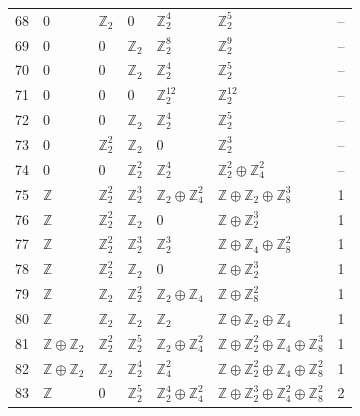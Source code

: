 \documentclass[10pt]{article}
\begin{document}
\begin{longtable}{rlllllr}
68 & $0$ & $\mathbb{Z}_{2}$ & $0$ & $\mathbb{Z}_{2}^{4}$ & $\mathbb{Z}_{2}^{5}$ & -- \\
69 & $0$ & $0$ & $\mathbb{Z}_{2}$ & $\mathbb{Z}_{2}^{8}$ & $\mathbb{Z}_{2}^{9}$ & -- \\
70 & $0$ & $0$ & $\mathbb{Z}_{2}$ & $\mathbb{Z}_{2}^{4}$ & $\mathbb{Z}_{2}^{5}$ & -- \\
71 & $0$ & $0$ & $0$ & $\mathbb{Z}_{2}^{12}$ & $\mathbb{Z}_{2}^{12}$ & -- \\
72 & $0$ & $0$ & $\mathbb{Z}_{2}$ & $\mathbb{Z}_{2}^{4}$ & $\mathbb{Z}_{2}^{5}$ & -- \\
73 & $0$ & $\mathbb{Z}_{2}^{2}$ & $\mathbb{Z}_{2}$ & $0$ & $\mathbb{Z}_{2}^{3}$ & -- \\
74 & $0$ & $0$ & $\mathbb{Z}_{2}^{2}$ & $\mathbb{Z}_{2}^{4}$ & $\mathbb{Z}_{2}^{2}\oplus \mathbb{Z}_{4}^{2}$ & -- \\
75 & $\mathbb{Z}$ & $\mathbb{Z}_{2}^{2}$ & $\mathbb{Z}_{2}^{3}$ & $\mathbb{Z}_{2}\oplus \mathbb{Z}_{4}^{2}$ & $\mathbb{Z}\oplus \mathbb{Z}_{2}\oplus \mathbb{Z}_{8}^{3}$ & 1 \\
76 & $\mathbb{Z}$ & $\mathbb{Z}_{2}^{2}$ & $\mathbb{Z}_{2}$ & $0$ & $\mathbb{Z}\oplus \mathbb{Z}_{2}^{3}$ & 1 \\
77 & $\mathbb{Z}$ & $\mathbb{Z}_{2}^{2}$ & $\mathbb{Z}_{2}^{3}$ & $\mathbb{Z}_{2}^{3}$ & $\mathbb{Z}\oplus \mathbb{Z}_{4}\oplus \mathbb{Z}_{8}^{2}$ & 1 \\
78 & $\mathbb{Z}$ & $\mathbb{Z}_{2}^{2}$ & $\mathbb{Z}_{2}$ & $0$ & $\mathbb{Z}\oplus \mathbb{Z}_{2}^{3}$ & 1 \\
79 & $\mathbb{Z}$ & $\mathbb{Z}_{2}$ & $\mathbb{Z}_{2}^{2}$ & $\mathbb{Z}_{2}\oplus \mathbb{Z}_{4}$ & $\mathbb{Z}\oplus \mathbb{Z}_{8}^{2}$ & 1 \\
80 & $\mathbb{Z}$ & $\mathbb{Z}_{2}$ & $\mathbb{Z}_{2}$ & $\mathbb{Z}_{2}$ & $\mathbb{Z}\oplus \mathbb{Z}_{2}\oplus \mathbb{Z}_{4}$ & 1 \\
81 & $\mathbb{Z}\oplus \mathbb{Z}_{2}$ & $\mathbb{Z}_{2}^{2}$ & $\mathbb{Z}_{2}^{5}$ & $\mathbb{Z}_{2}\oplus \mathbb{Z}_{4}^{2}$ & $\mathbb{Z}\oplus \mathbb{Z}_{2}^{2}\oplus \mathbb{Z}_{4}\oplus \mathbb{Z}_{8}^{3}$ & 1 \\
82 & $\mathbb{Z}\oplus \mathbb{Z}_{2}$ & $\mathbb{Z}_{2}$ & $\mathbb{Z}_{2}^{4}$ & $\mathbb{Z}_{4}^{2}$ & $\mathbb{Z}\oplus \mathbb{Z}_{2}^{2}\oplus \mathbb{Z}_{4}\oplus \mathbb{Z}_{8}^{2}$ & 1 \\
83 & $\mathbb{Z}$ & $0$ & $\mathbb{Z}_{2}^{5}$ & $\mathbb{Z}_{2}^{4}\oplus \mathbb{Z}_{4}^{2}$ & $\mathbb{Z}\oplus \mathbb{Z}_{2}^{3}\oplus \mathbb{Z}_{4}^{2}\oplus \mathbb{Z}_{8}^{2}$ & 2 \\

\end{longtable}
\end{document}
